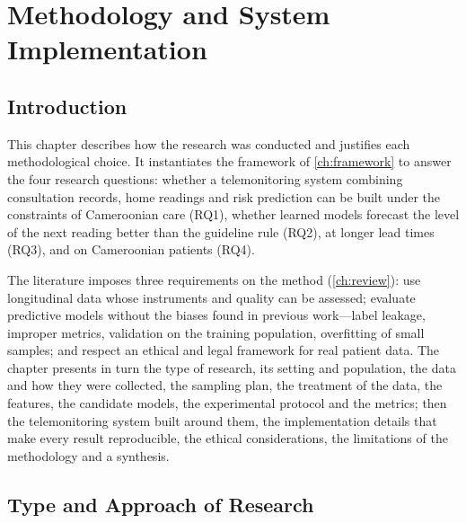 \chapter{Methodology and System Implementation}\label{ch:methodology}\label{ch:data}\label{ch:architecture}

\section{Introduction}\label{sec:meth-intro}

This chapter describes how the research was conducted and justifies each methodological choice. It instantiates the framework of \cref{ch:framework} to answer the four research questions: whether a telemonitoring system combining consultation records, home readings and risk prediction can be built under the constraints of Cameroonian care (RQ1), whether learned models forecast the level of the next reading better than the guideline rule (RQ2), at longer lead times (RQ3), and on Cameroonian patients (RQ4).

The literature imposes three requirements on the method (\cref{ch:review}): use longitudinal data whose instruments and quality can be assessed; evaluate predictive models without the biases found in previous work---label leakage, improper metrics, validation on the training population, overfitting of small samples; and respect an ethical and legal framework for real patient data. The chapter presents in turn the type of research, its setting and population, the data and how they were collected, the sampling plan, the treatment of the data, the features, the candidate models, the experimental protocol and the metrics; then the telemonitoring system built around them, the implementation details that make every result reproducible, the ethical considerations, the limitations of the methodology and a synthesis.

\section{Type and Approach of Research}\label{sec:research-type}\label{sec:analysis}

